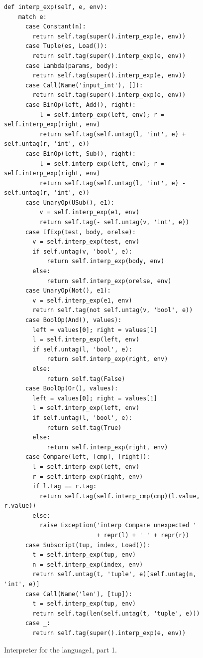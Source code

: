 \documentclass[7x10]{TimesAPriori_MIT}%
\def\pythonEd{1}
\def\edition{1}
\newcommand{\pythonColor}[0]{}
\newcommand{\python}[1]{{\if\edition\pythonEd\pythonColor #1\fi}}
\numberwithin{theorem}{chapter}
\numberwithin{definition}{chapter}
\numberwithin{equation}{chapter}
\begin{document}
\begin{figure}[tbp]
\begin{tcolorbox}[colback=white]
{\begin{lstlisting}[basicstyle=\ttfamily\footnotesize]
  def interp_exp(self, e, env):
    match e:
      case Constant(n):
        return self.tag(super().interp_exp(e, env))
      case Tuple(es, Load()):
        return self.tag(super().interp_exp(e, env))
      case Lambda(params, body):
        return self.tag(super().interp_exp(e, env))
      case Call(Name('input_int'), []):
        return self.tag(super().interp_exp(e, env))
      case BinOp(left, Add(), right):
          l = self.interp_exp(left, env); r = self.interp_exp(right, env)
          return self.tag(self.untag(l, 'int', e) + self.untag(r, 'int', e))
      case BinOp(left, Sub(), right):
          l = self.interp_exp(left, env); r = self.interp_exp(right, env)
          return self.tag(self.untag(l, 'int', e) - self.untag(r, 'int', e))
      case UnaryOp(USub(), e1):
          v = self.interp_exp(e1, env)
          return self.tag(- self.untag(v, 'int', e))
      case IfExp(test, body, orelse):
        v = self.interp_exp(test, env)
        if self.untag(v, 'bool', e):
            return self.interp_exp(body, env)
        else:
            return self.interp_exp(orelse, env)
      case UnaryOp(Not(), e1):
        v = self.interp_exp(e1, env)
        return self.tag(not self.untag(v, 'bool', e))
      case BoolOp(And(), values):
        left = values[0]; right = values[1]
        l = self.interp_exp(left, env)
        if self.untag(l, 'bool', e):
            return self.interp_exp(right, env)
        else:
            return self.tag(False)
      case BoolOp(Or(), values):
        left = values[0]; right = values[1]
        l = self.interp_exp(left, env)
        if self.untag(l, 'bool', e):
            return self.tag(True)
        else:
            return self.interp_exp(right, env)
      case Compare(left, [cmp], [right]):
        l = self.interp_exp(left, env)
        r = self.interp_exp(right, env)
        if l.tag == r.tag:
          return self.tag(self.interp_cmp(cmp)(l.value, r.value))
        else:
          raise Exception('interp Compare unexpected '
                          + repr(l) + ' ' + repr(r))
      case Subscript(tup, index, Load()):
        t = self.interp_exp(tup, env)
        n = self.interp_exp(index, env)
        return self.untag(t, 'tuple', e)[self.untag(n, 'int', e)]
      case Call(Name('len'), [tup]):
        t = self.interp_exp(tup, env)
        return self.tag(len(self.untag(t, 'tuple', e)))
      case _:
        return self.tag(super().interp_exp(e, env))
\end{lstlisting}
\fi}
  \end{tcolorbox}

  \caption{Interpreter for the \LangDyn{} language\python{, part 1}.}
\label{fig:interp-Ldyn}
\end{figure}
\end{document}
